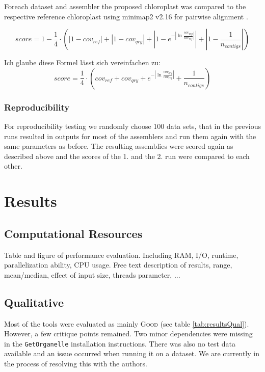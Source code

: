 \documentclass{bmcart}
\newcommand{\formatprogramnames}[1]{\texttt{#1}}
\newcommand{\go}{\formatprogramnames{GetOrganelle}}
\newcommand{\good}{\textsc{Good}}
\begin{document}
Foreach dataset and assembler the proposed chloroplast was compared to the respective reference chloroplast using minimap2 v2.16 for pairwise alignment \cite{li2018minimap2}.

\[ score = 1 - \frac{1}{4} \cdot \left( |1- cov_{ref}| +  |1- cov_{qry}| + \left|1- e^{-\left| \ln{\frac{cov_{qry}}{cov_{ref}}}\right|}\right| + \left| 1 - \frac{1}{n_{contigs}} \right| \right) \]

Ich glaube diese Formel lässt sich vereinfachen zu:
\[ score = \frac{1}{4} \cdot \left( cov_{ref} +  cov_{qry} + e^{-\left| \ln{\frac{cov_{qry}}{cov_{ref}}}\right|} + \frac{1}{n_{contigs} }\right) \]




\subsubsection*{Reproducibility}
For reproducibility  testing we randomly choose 100 data sets, that in the previous runs resulted in outputs for most of the assemblers and run them again with the same parameters as before. The resulting assemblies were scored again as described above and the scores of the 1. and the 2. run were compared to each other. 

\section*{Results}
\subsection*{Computational Resources}
Table and figure of performance evaluation. Including RAM, I/O, runtime, parallelization ability, CPU usage. Free text description of results, range, mean/median, effect of input size, threads parameter, ...

\subsection*{Qualitative}
Most of the tools were evaluated as mainly \good{} (see table \ref{tab:resultsQual}). However, a few critique points remained.
Two minor dependencies were missing in the \go{} installation instructions. There was also no test data available and an issue occurred when running it on a  dataset. We are currently in the process of resolving this with the authors.
\end{document}
